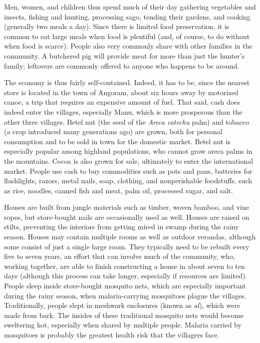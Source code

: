Men, women, and children thus spend much of their day gathering vegetables and insects, fishing and hunting, processing sago, tending their gardens, and cooking (generally two meals a day). Since there is limited food preservation, it is common to eat large meals when food is plentiful (and, of course, to do without when food is scarce). People also very commonly share with other families in the community. A butchered pig will provide meat for more than just the hunter’s family; leftovers are commonly offered to anyone who happens to be around.

The economy is thus fairly self-contained. Indeed, it has to be, since the nearest store is located in the town of Angoram, about six hours away by motorized canoe, a trip that requires an expensive amount of fuel. That said, cash does indeed enter the villages, especially Manu, which is more prosperous than the other three villages. Betel nut (the seed of the \textit{Areca catechu} palm) and tobacco (a crop introduced many generations ago) are grown, both for personal consumption and to be sold in town for the domestic market. Betel nut is especially popular among highland populations, who cannot grow areca palms in the mountains. Cocoa is also grown for sale, ultimately to enter the international market. People use cash to buy commodities such as pots and pans, batteries for flashlights, razors, metal nails, soap, clothing, and nonperishable foodstuffs, such as rice, noodles, canned fish and meat, palm oil, processed sugar, and salt.

Houses are built from jungle materials such as timber, woven bamboo, and vine ropes, but store-bought nails are occasionally used as well. Houses are raised on stilts, preventing the interiors from getting mired in swamp during the rainy season. Houses may contain multiple rooms as well as outdoor verandas, although some consist of just a single large room. They typically need to be rebuilt every five to seven years, an effort that can involve much of the community, who, working together, are able to finish constructing a house in about seven to ten days (although this process can take longer, especially if resources are limited). People sleep inside store-bought mosquito nets, which are especially important during the rainy season, when malaria-carrying mosquitoes plague the villages. Traditionally, people slept in meshwork enclosures (known as \textit{al}), which were made from bark. The insides of these traditional mosquito nets would become sweltering hot, especially when shared by multiple people. Malaria carried by mosquitoes is probably the greatest health risk that the villagers face.

